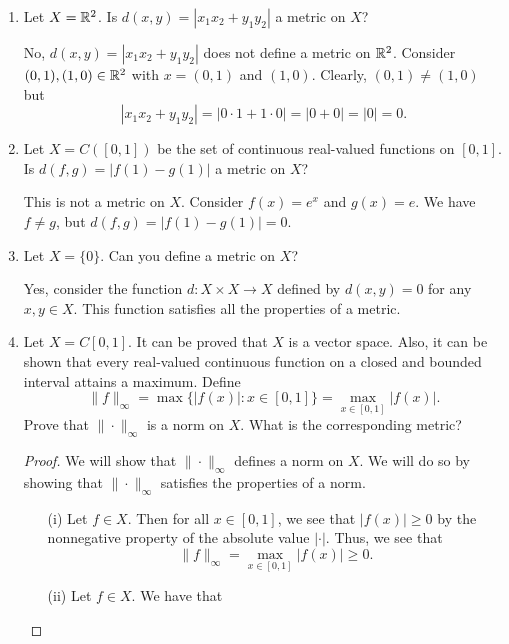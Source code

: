 \documentclass{article}
\begin{document}
\begin{enumerate}
\begin{remark}
    \end{remark}
\item Let \( X = \mathbb{R}^{2} \). Is \( d(x,y) = | {x}_{1} {x}_{2} + {y}_{1} {y}_{2} |  \) a metric on \( X  \)?
    \begin{solution}
    No, \( d(x,y) = | {x}_{1} {x}_{2} + {y}_{1} {y}_{2} |  \) does not define a metric on \( \mathbb{R}^{2} \). Consider \( (0,1), (1,0) \in \mathbb{R}^{2} \) with \( x = (0,1) \) and \( (1,0) \). Clearly, \( (0,1) \neq (1,0) \) but  
    \[  | {x}_{1} {x}_{2} + {y}_{1} {y}_{2} | = | 0 \cdot 1 + 1 \cdot 0   | = | 0 + 0  | =  |  0  |  =  0.   \]
    \end{solution}
\item Let \( X = C([0,1]) \) be the set of continuous real-valued functions on \( [0,1] \). Is \( d(f,g) = | f(1) - g(1) |  \) a metric on \( X  \)?
    \begin{solution}
        This is not a metric on \( X  \). Consider \( f(x) = e^{x} \) and \( g(x) = e \). We have \( f \neq g   \), but \( d(f,g) = | f(1) - g(1) | = 0  \).
    \end{solution}
\item Let \( X = \{ 0 \}  \). Can you define a metric on \( X  \)?
    \begin{solution}
        Yes, consider the function \( d: X \times X \to X  \) defined by \( d(x,y) = 0 \) for any \( x,y \in X  \). This function satisfies all the properties of a metric.
    \end{solution}
\item Let \( X = C[0,1] \). It can be proved that \( X  \) is a vector space. Also, it can be shown that every real-valued continuous function on a closed and bounded interval attains a maximum. Define 
    \[  \|f\|_{\infty } = \max \{ | f(x) |  : x \in [0,1] \} = \max_{x \in [0,1]} | f(x) |.  \] 
    Prove that \( \|\cdot\|_{\infty } \) is a norm on \( X  \). What is the corresponding metric?
    \begin{proof}
        We will show that \( \|\cdot\|_{\infty } \) defines a norm on \( X  \). We will do so by showing that \( \|\cdot\|_{\infty } \) satisfies the properties of a norm.     
        \begin{enumerate}
            \item[(i)] Let \( f \in X  \). Then for all \( x \in [0,1] \), we see that \( | f(x)  | \geq 0  \) by the nonnegative property of the absolute value \( | \cdot |  \). Thus, we see that 
                \[ \|f\|_{\infty } = \max_{x \in [0,1]} | f(x) | \geq 0.    \]
            \item[(ii)] Let \( f \in X  \). We have that 

\end{enumerate}
\end{proof}
\end{enumerate}
\end{document}
